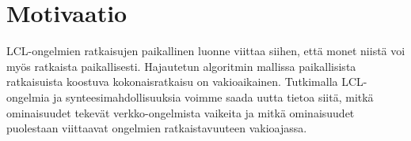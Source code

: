 \documentclass[12pt,finnish]{tktltiki2}
\theoremstyle{definition}
\theoremstyle{remark}
\begin{document}
\section{Motivaatio}

LCL-ongelmien ratkaisujen paikallinen luonne viittaa siihen, että monet niistä voi myös ratkaista paikallisesti. Hajautetun algoritmin mallissa paikallisista ratkaisuista koostuva kokonaisratkaisu on vakioaikainen. Tutkimalla LCL-ongelmia ja synteesimahdollisuuksia voimme saada uutta tietoa siitä, mitkä ominaisuudet tekevät verkko-ongelmista vaikeita ja mitkä ominaisuudet puolestaan viittaavat ongelmien ratkaistavuuteen vakioajassa.


%
%
% 
%




% 
\end{document}
